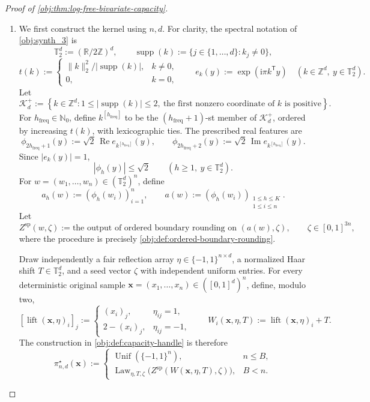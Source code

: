 \begin{proof}[Proof of \cref{obj:thm:log-free-bivariate-capacity}]
\begin{enumerate}
\item
We first construct the kernel using \(n,d\). For clarity, the spectral notation of \cref{obj:synth_3} is
\[
\mathbb T_2^d:=(\mathbb R/2\mathbb Z)^d,
\qquad
\operatorname{supp}(k):=\{j\in\{1,\ldots,d\}:k_j\ne0\},
\]
\[
t(k):=
\begin{cases}
\|k\|_2^2/|\operatorname{supp}(k)|,&k\ne0,\\
0,&k=0,
\end{cases}
\qquad
e_k(y):=\exp(\mathrm i\pi k^{\mathsf T}y)
\quad(k\in\mathbb Z^d,\ y\in\mathbb T_2^d).
\]
Let
\[
\mathscr K_d^+
:=
\left\{
k\in\mathbb Z^d:
1\leq|\operatorname{supp}(k)|\leq2,\
\text{the first nonzero coordinate of }k\text{ is positive}
\right\}.
\]
For \(h_{\mathrm{freq}}\in\mathbb N_0\), define \(k^{[h_{\mathrm{freq}}]}\) to be the
\((h_{\mathrm{freq}}+1)\)-st member of \(\mathscr K_d^+\), ordered by increasing \(t(k)\), with lexicographic ties. The prescribed real features are
\[
\phi_{2h_{\mathrm{freq}}+1}(y)
:=\sqrt2\,\operatorname{Re}e_{k^{[h_{\mathrm{freq}}]}}(y),
\qquad
\phi_{2h_{\mathrm{freq}}+2}(y)
:=\sqrt2\,\operatorname{Im}e_{k^{[h_{\mathrm{freq}}]}}(y).
\]
Since \(|e_k(y)|=1\),
\[
|\phi_h(y)|\leq\sqrt2
\qquad(h\geq1,\ y\in\mathbb T_2^d).
\]
For \(w=(w_1,\ldots,w_n)\in(\mathbb T_2^d)^n\), define
\[
a_h(w):=(\phi_h(w_i))_{i=1}^n,
\qquad
a(w):=(\phi_h(w_i))_{\substack{1\leq h\leq K\\1\leq i\leq n}}.
\]
Let
\[
Z^{\mathrm{sp}}(w,\zeta)
:=
\text{the output of ordered boundary rounding on }(a(w),\zeta),
\qquad
\zeta\in[0,1]^{3n},
\]
where the procedure is precisely \cref{obj:def:ordered-boundary-rounding}.

Draw independently a fair reflection array
\(\eta\in\{-1,1\}^{n\times d}\), a normalized Haar shift
\(T\in\mathbb T_2^d\), and a seed vector \(\zeta\) with independent uniform entries.
For every deterministic original sample
\(\mathbf x=(x_1,\ldots,x_n)\in([0,1]^d)^n\), define, modulo two,
\[
[\operatorname{lift}(\mathbf x,\eta)_i]_j
:=
\begin{cases}
(x_i)_j,&\eta_{ij}=1,\\
2-(x_i)_j,&\eta_{ij}=-1,
\end{cases}
\qquad
W_i(\mathbf x,\eta,T)
:=
\operatorname{lift}(\mathbf x,\eta)_i+T.
\]
The construction in \cref{obj:def:capacity-handle} is therefore
\[
\pi^\star_{n,d}(\mathbf x)
:=
\begin{cases}
\operatorname{Unif}(\{-1,1\}^n),&n\leq B,\\
\operatorname{Law}_{\eta,T,\zeta}
\bigl(Z^{\mathrm{sp}}(W(\mathbf x,\eta,T),\zeta)\bigr),&B<n.
\end{cases}
\]


\end{enumerate}
\end{proof}
